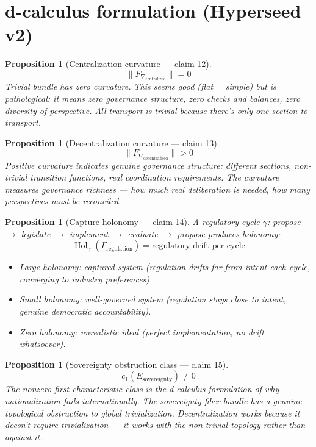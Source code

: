 \documentclass[11pt,a4paper]{article}
\newtheorem{proposition}[definition]{Proposition}
\begin{document}
\section{d-calculus formulation (Hyperseed v2)}

\begin{proposition}[Centralization curvature --- claim 12]
\label{prop:central_curv}
\[
  \|F_{\nabla_{\text{centralized}}}\| = 0
\]
Trivial bundle has zero curvature. This seems good (flat = simple)
but is pathological: it means zero governance structure, zero checks
and balances, zero diversity of perspective. All transport is trivial
because there's only one section to transport.
\end{proposition}

\begin{proposition}[Decentralization curvature --- claim 13]
\label{prop:decentral_curv}
\[
  \|F_{\nabla_{\text{decentralized}}}\| > 0
\]
Positive curvature indicates genuine governance structure: different
sections, non-trivial transition functions, real coordination
requirements. The curvature measures governance richness --- how much
real deliberation is needed, how many perspectives must be reconciled.
\end{proposition}

\begin{proposition}[Capture holonomy --- claim 14]
\label{prop:capture_hol}
A regulatory cycle $\gamma$: propose $\to$ legislate $\to$ implement
$\to$ evaluate $\to$ propose produces holonomy:
\[
  \operatorname{Hol}_\gamma(\Gamma_{\text{regulation}}) =
    \text{regulatory drift per cycle}
\]
\begin{itemize}
  \item Large holonomy: captured system (regulation drifts far from
    intent each cycle, converging to industry preferences).
  \item Small holonomy: well-governed system (regulation stays close
    to intent, genuine democratic accountability).
  \item Zero holonomy: unrealistic ideal (perfect implementation,
    no drift whatsoever).
\end{itemize}
\end{proposition}

\begin{proposition}[Sovereignty obstruction class --- claim 15]
\label{prop:sovereignty_class}
\[
  c_1(E_{\text{sovereignty}}) \neq 0
\]
The nonzero first characteristic class is the d-calculus formulation
of why nationalization fails internationally. The sovereignty fiber
bundle has a genuine topological obstruction to global trivialization.
Decentralization works because it doesn't require trivialization ---
it works with the non-trivial topology rather than against it.
\end{proposition}
\end{document}
